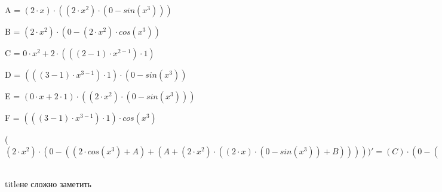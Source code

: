 \documentclass[12pt,a4paper,fleqn]{article}
\begin{document}
\begin{center}
A = $(2 \cdot x) \cdot ((2 \cdot x^{2}) \cdot (0-sin(x^{3})))$\end{center}
\begin{center}
B = $(2 \cdot x^{2}) \cdot (0-(2 \cdot x^{2}) \cdot cos(x^{3}))$\end{center}
\begin{center}
C = $0 \cdot x^{2}+2 \cdot (((2-1) \cdot x^{2-1}) \cdot 1)$\end{center}
\begin{center}
D = $(((3-1) \cdot x^{3-1}) \cdot 1) \cdot (0-sin(x^{3}))$\end{center}
\begin{center}
E = $(0 \cdot x+2 \cdot 1) \cdot ((2 \cdot x^{2}) \cdot (0-sin(x^{3})))$\end{center}
\begin{center}
F = $(((3-1) \cdot x^{3-1}) \cdot 1) \cdot cos(x^{3})$\end{center}
\begin{center}
 ($(2 \cdot x^{2}) \cdot (0-((2 \cdot cos(x^{3})+A)+(A+(2 \cdot x^{2}) \cdot ((2 \cdot x) \cdot (0-sin(x^{3}))+B)))))'
  = (C) \cdot (0-((2 \cdot cos(x^{3})+A)+(A+(2 \cdot x^{2}) \cdot ((2 \cdot x) \cdot (0-sin(x^{3}))+B))))+(2 \cdot x^{2}) \cdot (0-(((0 \cdot cos(x^{3})+2 \cdot (D))+(E+(2 \cdot x) \cdot ((C) \cdot (0-sin(x^{3}))+(2 \cdot x^{2}) \cdot (0-F))))+((E+(2 \cdot x) \cdot ((C) \cdot (0-sin(x^{3}))+(2 \cdot x^{2}) \cdot (0-F)))+((C) \cdot ((2 \cdot x) \cdot (0-sin(x^{3}))+B)+(2 \cdot x^{2}) \cdot (((0 \cdot x+2 \cdot 1) \cdot (0-sin(x^{3}))+(2 \cdot x) \cdot (0-F))+((C) \cdot (0-(2 \cdot x^{2}) \cdot cos(x^{3}))+(2 \cdot x^{2}) \cdot (0-((C) \cdot cos(x^{3})+(2 \cdot x^{2}) \cdot (D)))))))))$\end{center}
\\ title{не сложно заметить} 
\end{document}
